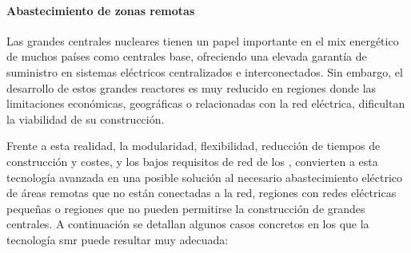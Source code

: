 \paragraph{Abastecimiento de zonas remotas}

Las grandes centrales nucleares tienen un papel importante en el mix energético de muchos países como centrales base, ofreciendo una elevada garantía de suministro en sistemas eléctricos centralizados e interconectados. Sin embargo, el desarrollo de estos grandes reactores es muy reducido en regiones donde las limitaciones económicas, geográficas o relacionadas con la red eléctrica, dificultan la viabilidad de su construcción. 

Frente a esta realidad, la modularidad, flexibilidad, reducción de tiempos de construcción y costes, y los bajos requisitos de red de los , convierten a esta tecnología avanzada en una posible solución al necesario abastecimiento eléctrico de áreas remotas que no están conectadas a la red, regiones con redes eléctricas pequeñas o regiones que no pueden permitirse la construcción de grandes centrales. A continuación se detallan algunos casos concretos en los que la tecnología \acrshort{smr} puede resultar muy adecuada:

